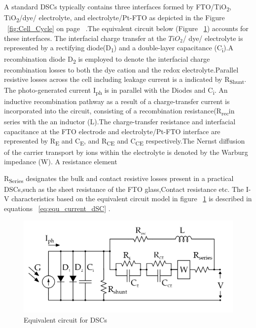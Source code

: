 A standard \ac{DSCs} typically contains three interfaces formed by FTO/TiO\textsubscript{2}, TiO\textsubscript{2}/dye/ electrolyte, and electrolyte/Pt-FTO as depicted in the Figure ~\ref{fig:Cell_Cycle} on page ~\pageref{fig:Cell_Cycle}.The equivalent circuit below (Figure ~\ref{fig:dsc_eq_ckt}) accounts for these interfaces. The interfacial charge transfer at the $TiO_{2}$/ dye/ electrolyte is represented by a rectifying diode(D\textsubscript{1}) and a double-layer capacitance (C\textsubscript{i}).A recombination diode D\textsubscript{2} is employed to denote the interfacial charge recombination losses to both the dye cation and the redox electrolyte.Parallel resistive losses across the cell including leakage current is a indicated by R\textsubscript{Shunt}. The photo-generated current I\textsubscript{ph} is in parallel with the Diodes and C\textsubscript{i}. An inductive recombination pathway as a result of a charge-transfer current is incorporated into the circuit, consisting of a recombination resistance(R\textsubscript{rec}in series with the an inductor (L).The charge-transfer resistance and interfacial capacitance at the FTO electrode and electrolyte/Pt-FTO interface are represented by R\textsubscript{E} and C\textsubscript{E}, and R\textsubscript{CE} and C\textsubscript{CE} respectively.The Nernst diffusion of the carrier transport by ions within the electrolyte is denoted by the Warburg impedance (W). A resistance element {R\textsubscript{Series} designates the bulk and contact resistive losses present in a practical \ac{DSCs},such as the sheet resistance of the FTO glass,Contact resistance etc. The I-V characteristics based on the equivalent circuit model in figure ~\ref{fig:dsc_eq_ckt} is described in equations ~\ref{eq:equ_current_dSC} \cite{yong2008modeling}.
    


 \begin{figure}[H]
  \begin{center}
	\includegraphics[width=1.1\linewidth]{images/dsc_eq_ckt}
	\caption{Equivalent circuit for DSCs  }
	\label{fig:dsc_eq_ckt}
  \end{center}
  \end{figure}

}
